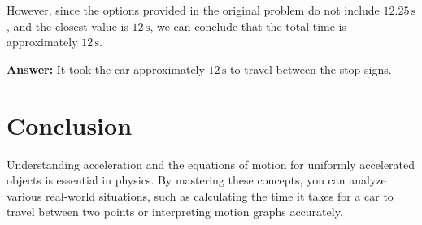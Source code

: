 \documentclass{article}
\begin{document}
However, since the options provided in the original problem do not include \( 12.25 \, \text{s} \), and the closest value is \( 12 \, \text{s} \), we can conclude that the total time is approximately \( 12 \, \text{s} \).

\textbf{Answer:} It took the car approximately \( 12 \, \text{s} \) to travel between the stop signs.

\section{Conclusion}

Understanding acceleration and the equations of motion for uniformly accelerated objects is essential in physics. By mastering these concepts, you can analyze various real-world situations, such as calculating the time it takes for a car to travel between two points or interpreting motion graphs accurately.
\end{document}
